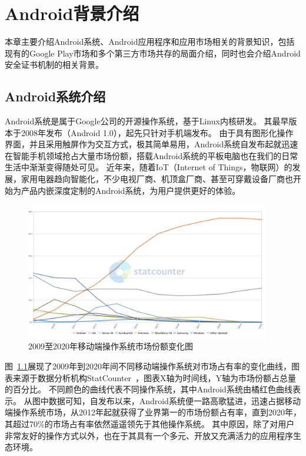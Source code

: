 \chapter{Android背景介绍}
\label{chp:background}

本章主要介绍Android系统、Android应用程序和应用市场相关的背景知识，包括现有的Google Play市场和多个第三方市场共存的局面介绍，同时也会介绍Android安全证书机制的相关背景。

\section{Android系统介绍}
Android系统是属于Google公司的开源操作系统，基于Linux内核研发。
其最早版本于2008年发布（Android 1.0），起先只针对手机端发布。
由于具有图形化操作界面，并且采用触屏作为交互方式，极其简单易用，Android系统自发布起就迅速在智能手机领域抢占大量市场份额，搭载Android系统的平板电脑也在我们的日常生活中渐渐变得随处可见。
近年来，随着IoT（Internet of Things，物联网）的发展，家用电器趋向智能化，不少电视厂商、机顶盒厂商、甚至可穿戴设备厂商也开始为产品内嵌深度定制的Android系统，为用户提供更好的体验。

\begin{figure}[htbp]
	\centering
	\includegraphics[width=0.95\textwidth]{./Figures/edwin-StatCounter-os-mkt-share-yearly-2009-2020.jpg}
	\caption{2009至2020年移动端操作系统市场份额变化图}
	\label{fig:Android-Mkt-Share}
	\vspace{-5mm}
\end{figure}

图~\ref{fig:Android-Mkt-Share}展现了2009年到2020年间不同移动端操作系统对市场占有率的变化曲线，图表来源于数据分析机构StatCounter~\cite{MobileOSMktShare}，图表X轴为时间线，Y轴为市场份额占总量的百分比。
不同颜色的曲线代表不同操作系统，其中Android系统由橘红色曲线表示。
从图中数据可知，自发布以来，Android系统便一路高歌猛进，迅速占据移动端操作系统市场，从2012年起就获得了业界第一的市场份额占有率，直到2020年，其超过70\%的市场占有率依然遥遥领先于其他操作系统。
其中原因，除了对用户非常友好的操作方式以外，也在于其具有一个多元、开放又充满活力的应用程序生态环境。

